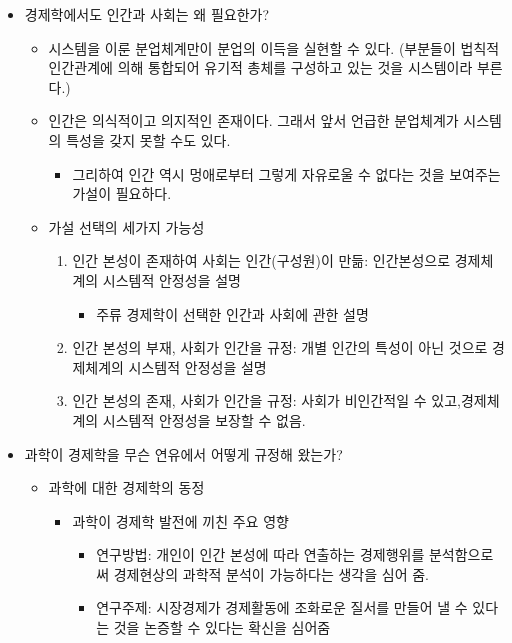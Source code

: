 \documentclass{report}
\begin{document}
\begin{itemize}
    \item 경제학에서도 인간과 사회는 왜 필요한가?
    \begin{itemize}
        \item 시스템을 이룬 분업체계만이 분업의 이득을 실현할 수 있다. (부분들이 법칙적 인간관계에 의해 통합되어 유기적 총체를 구성하고 있는 것을 시스템이라 부른다.)
        \item 인간은 의식적이고 의지적인 존재이다. 그래서 앞서 언급한 분업체계가 시스템의 특성을 갖지 못할 수도 있다.
        \begin{itemize}
            \item 그리하여 인간 역시 멍애로부터 그렇게 자유로울 수 없다는 것을 보여주는 가설이 필요하다.
        \end{itemize}
        \item 가설 선택의 세가지 가능성
        \begin{enumerate}
            \item 인간 본성이 존재하여 사회는 인간(구성원)이 만듦: 인간본성으로 경제체계의 시스템적 안정성을 설명
            \begin{itemize}
                \item 주류 경제학이 선택한 인간과 사회에 관한 설명
            \end{itemize}
            \item 인간 본성의 부재, 사회가 인간을 규정: 개별 인간의 특성이 아닌 것으로 경제체계의 시스템적 안정성을 설명
            \item 인간 본성의 존재, 사회가 인간을 규정: 사회가 비인간적일 수 있고,경제체계의 시스템적 안정성을 보장할 수 없음.
        \end{enumerate}
    \end{itemize}
    \item 과학이 경제학을 무슨 연유에서 어떻게 규정해 왔는가?
    \begin{itemize}
        \item 과학에 대한 경제학의 동정
        \begin{itemize}
            \item 과학이 경제학 발전에 끼친 주요 영향
            \begin{itemize}
                \item 연구방법: 개인이 인간 본성에 따라 연출하는 경제행위를 분석함으로써 경제현상의 과학적 분석이 가능하다는 생각을 심어 줌.
                \item 연구주제: 시장경제가 경제활동에 조화로운 질서를 만들어 낼 수 있다는 것을 논증할 수 있다는 확신을 심어줌

\end{itemize}
\end{itemize}
\end{itemize}
\end{itemize}
\end{document}
